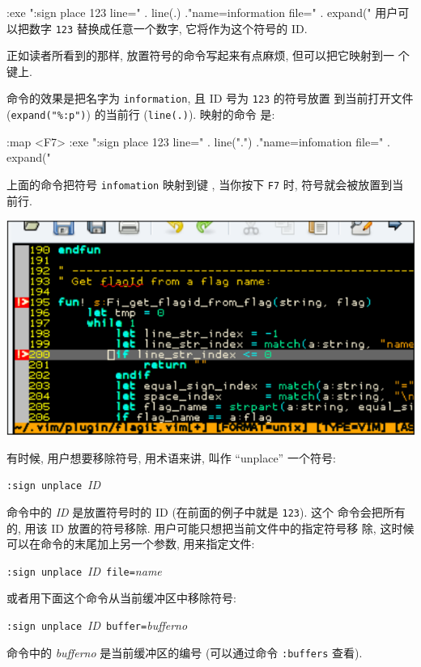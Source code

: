 \begin{vimcode}
:exe ":sign place 123 line=" . line(.) ."name=information file=" .
expand("%
用户可以把数字 \texttt{123} 替换成任意一个数字, 它将作为这个符号的 ID.

正如读者所看到的那样, 放置符号的命令写起来有点麻烦, 但可以把它映射到一
个键上.

命令的效果是把名字为 \texttt{information}, 且 ID 号为 \texttt{123} 的符号放置
到当前打开文件 (\verb'expand("%:p")') 的当前行 (\texttt{line(.)}). 映射的命令
是:
\begin{vimcode}
:map <F7> :exe ":sign place 123 line=" . line(".") ."name=infomation
file=" . expand("%
\end{vimcode}
上面的命令把符号 \texttt{infomation} 映射到键 , 当你按下 \texttt{F7}
时, 符号就会被放置到当前行.
\begin{center}
    \includegraphics[scale=0.6]{./images/page69.png}
\end{center}
有时候, 用户想要移除符号, 用术语来讲, 叫作 ``unplace'' 一个符号:
\begin{vimcmdform}
\texttt{:sign unplace}\ \textit{ID}
\end{vimcmdform}

命令中的 \textit{ID} 是放置符号时的 ID (在前面的例子中就是 \texttt{123}). 这个
命令会把所有的, 用该 ID 放置的符号移除. 用户可能只想把当前文件中的指定符号移
除, 这时候可以在命令的末尾加上另一个参数, 用来指定文件:
\begin{vimcmdform}
\texttt{:sign unplace}\ \textit{ID}\ \texttt{file=}\textit{name}
\end{vimcmdform}
或者用下面这个命令从当前缓冲区中移除符号:
\begin{vimcmdform}
\texttt{:sign unplace}\ \textit{ID}\ \texttt{buffer=}\textit{bufferno}
\end{vimcmdform}
命令中的 \textit{bufferno} 是当前缓冲区的编号 (可以通过命令 \texttt{:buffers}
查看).


\end{vimcode}
